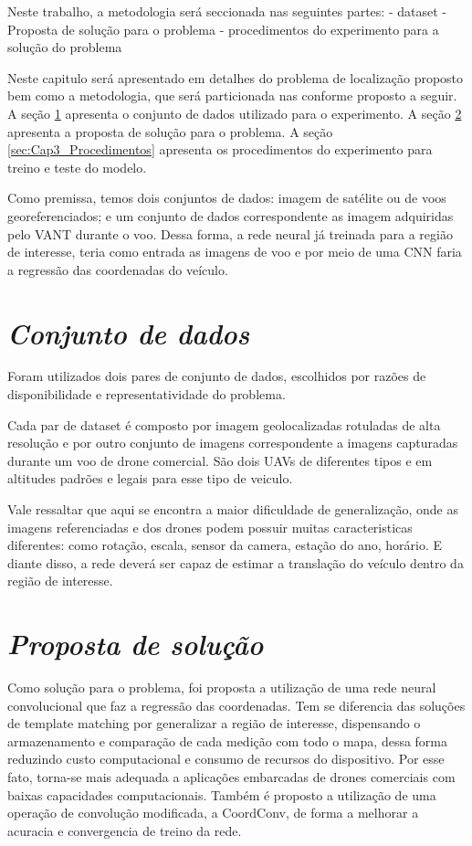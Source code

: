 Neste trabalho, a metodologia será seccionada nas seguintes partes:
 - dataset
 - Proposta de solução para o problema
 - procedimentos do experimento para a solução do problema

Neste capitulo será apresentado em detalhes do problema de localização proposto bem como a metodologia, que será particionada nas conforme proposto a seguir. A seção \ref{sec:Cap3_Dataset} apresenta o conjunto de dados utilizado para o experimento. A seção \ref{sec:Cap3_Proposta} apresenta a proposta de solução para o problema. A seção \ref{sec:Cap3_Procedimentos} apresenta os procedimentos do experimento para treino e teste do modelo.



Como premissa, temos dois conjuntos de dados: imagem de satélite ou de voos georeferenciados; e um conjunto de dados correspondente as imagem adquiridas pelo VANT durante o voo. Dessa forma, a rede neural já treinada para a região de interesse, teria como entrada as imagens de voo e por meio de uma CNN faria a regressão das coordenadas do veículo.

\section{\textit{Conjunto de dados}}\label{sec:Cap3_Dataset}
Foram utilizados dois pares de conjunto de dados, escolhidos por razões de disponibilidade e representatividade do problema.


Cada par de dataset é composto por imagem geolocalizadas rotuladas de alta resolução e por outro conjunto de imagens correspondente a imagens capturadas durante um voo de drone comercial. São dois UAVs de diferentes tipos e em altitudes padrões e legais para esse tipo de veiculo.

Vale ressaltar que aqui se encontra a maior dificuldade de generalização, onde as imagens referenciadas e dos drones podem possuir muitas caracteristicas diferentes: como rotação, escala, sensor da camera, estação do ano, horário. E diante disso, a rede deverá ser capaz de estimar a translação do veículo dentro da região de interesse.


\section{\textit{Proposta de solução}}\label{sec:Cap3_Proposta}

Como solução para o problema, foi proposta a utilização de uma rede neural convolucional que faz a regressão das coordenadas. Tem se diferencia das soluções de template matching por generalizar a região de interesse, dispensando o armazenamento e comparação de cada medição com todo o mapa, dessa forma reduzindo custo computacional e consumo de recursos do dispositivo. Por esse fato, torna-se mais adequada a aplicações embarcadas de drones comerciais com baixas capacidades computacionais.
Também é proposto a utilização de uma operação de convolução modificada, a CoordConv, de forma a melhorar a acuracia e convergencia de treino da rede.

